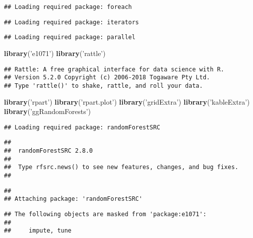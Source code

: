 \documentclass[]{article}
\newenvironment{Shaded}{\begin{snugshade}}{\end{snugshade}}
\newcommand{\KeywordTok}[1]{\textcolor[rgb]{0.13,0.29,0.53}{\textbf{#1}}}
\newcommand{\StringTok}[1]{\textcolor[rgb]{0.31,0.60,0.02}{#1}}
\newcommand{\NormalTok}[1]{#1}
\begin{document}
\begin{verbatim}
## Loading required package: foreach
\end{verbatim}

\begin{verbatim}
## Loading required package: iterators
\end{verbatim}

\begin{verbatim}
## Loading required package: parallel
\end{verbatim}

\begin{Shaded}
\begin{Highlighting}[]
\KeywordTok{library}\NormalTok{(}\StringTok{'e1071'}\NormalTok{)}
\KeywordTok{library}\NormalTok{(}\StringTok{'rattle'}\NormalTok{)}
\end{Highlighting}
\end{Shaded}

\begin{verbatim}
## Rattle: A free graphical interface for data science with R.
## Version 5.2.0 Copyright (c) 2006-2018 Togaware Pty Ltd.
## Type 'rattle()' to shake, rattle, and roll your data.
\end{verbatim}

\begin{Shaded}
\begin{Highlighting}[]
\KeywordTok{library}\NormalTok{(}\StringTok{'rpart'}\NormalTok{)}
\KeywordTok{library}\NormalTok{(}\StringTok{'rpart.plot'}\NormalTok{)}
\KeywordTok{library}\NormalTok{(}\StringTok{'gridExtra'}\NormalTok{)}
\KeywordTok{library}\NormalTok{(}\StringTok{'kableExtra'}\NormalTok{)}
\KeywordTok{library}\NormalTok{(}\StringTok{'ggRandomForests'}\NormalTok{)}
\end{Highlighting}
\end{Shaded}

\begin{verbatim}
## Loading required package: randomForestSRC
\end{verbatim}

\begin{verbatim}
## 
##  randomForestSRC 2.8.0 
##  
##  Type rfsrc.news() to see new features, changes, and bug fixes. 
## 
\end{verbatim}

\begin{verbatim}
## 
## Attaching package: 'randomForestSRC'
\end{verbatim}

\begin{verbatim}
## The following objects are masked from 'package:e1071':
## 
##     impute, tune
\end{verbatim}
\end{document}
